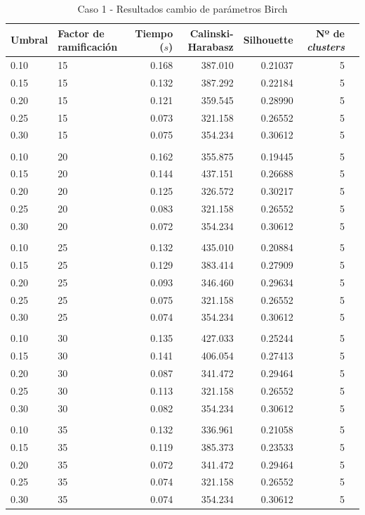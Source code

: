 \documentclass[a4paper, 20pt]{article}
\begin{document}
\begin{table}[H]
\centering
\caption{Caso 1 - Resultados cambio de parámetros Birch}
\label{tab:param_birch1}
\begin{tabular}{llrrrrr}
\toprule
 Umbral & Factor de ramificación & Tiempo ($s$) & Calinski-Harabasz & Silhouette & Nº de \textit{clusters} \\
\midrule
0.10 & 15 & 0.168 & 387.010 & 0.21037 & 5 \\
0.15 & 15 & 0.132 & 387.292 & 0.22184 & 5 \\
0.20 & 15 & 0.121 & 359.545 & 0.28990 & 5 \\
0.25 & 15 & 0.073 & 321.158 & 0.26552 & 5 \\
0.30 & 15 & 0.075 & 354.234 & 0.30612 & 5 \\
\\
0.10 & 20 & 0.162 & 355.875 & 0.19445 & 5 \\
0.15 & 20 & 0.144 & 437.151 & 0.26688 & 5 \\
0.20 & 20 & 0.125 & 326.572 & 0.30217 & 5 \\
0.25 & 20 & 0.083 & 321.158 & 0.26552 & 5 \\
0.30 & 20 & 0.072 & 354.234 & 0.30612 & 5 \\
\\
0.10 & 25 & 0.132 & 435.010 & 0.20884 & 5 \\
0.15 & 25 & 0.129 & 383.414 & 0.27909 & 5 \\
0.20 & 25 & 0.093 & 346.460 & 0.29634 & 5 \\
0.25 & 25 & 0.075 & 321.158 & 0.26552 & 5 \\
0.30 & 25 & 0.074 & 354.234 & 0.30612 & 5 \\
\\
0.10 & 30 & 0.135 & 427.033 & 0.25244 & 5 \\
0.15 & 30 & 0.141 & 406.054 & 0.27413 & 5 \\
0.20 & 30 & 0.087 & 341.472 & 0.29464 & 5 \\
0.25 & 30 & 0.113 & 321.158 & 0.26552 & 5 \\
0.30 & 30 & 0.082 & 354.234 & 0.30612 & 5 \\
\\
0.10 & 35 & 0.132 & 336.961 & 0.21058 & 5 \\
0.15 & 35 & 0.119 & 385.373 & 0.23533 & 5 \\
0.20 & 35 & 0.072 & 341.472 & 0.29464 & 5 \\
0.25 & 35 & 0.074 & 321.158 & 0.26552 & 5 \\
0.30 & 35 & 0.074 & 354.234 & 0.30612 & 5 \\
\bottomrule
\end{tabular}
\end{table}
\end{document}
